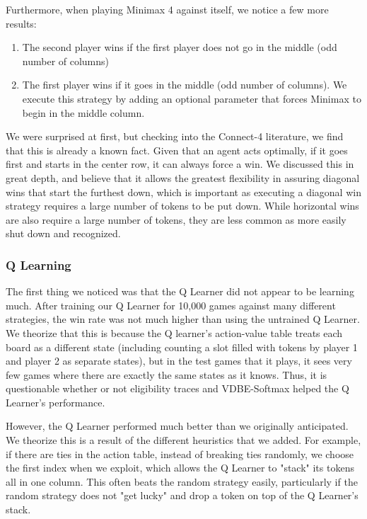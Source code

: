 \documentclass[12pt]{article}
\begin{document}
Furthermore, when playing Minimax 4 against itself, we notice a few more results:

\begin{enumerate}
\item The second player wins if the first player does not go in the middle (odd number of columns)
\item The first player wins if it goes in the middle (odd number of columns). We execute this strategy by adding an optional parameter that forces Minimax to begin in the middle column.
\end{enumerate}

We were surprised at first, but checking into the Connect-4 literature, we find that this is already a known fact. Given that an agent acts optimally, if it goes first and starts in the center row, it can always force a win. We discussed this in great depth, and believe that it allows the greatest flexibility in assuring diagonal wins that start the furthest down, which is important as executing a diagonal win strategy requires a large number of tokens to be put down. While horizontal wins are also require a large number of tokens, they are less common as more easily shut down and recognized.

\subsubsection{Q Learning}

The first thing we noticed was that the Q Learner did not appear to be learning much. After training our Q Learner for 10,000 games against many different strategies, the win rate was not much higher than using the untrained Q Learner. We theorize that this is because the Q learner's action-value table treats each board as a different state (including counting a slot filled with tokens by player 1 and player 2 as separate states), but in the test games that it plays, it sees very few games where there are exactly the same states as it knows. Thus, it is questionable whether or not eligibility traces and VDBE-Softmax helped the Q Learner's performance.

However, the Q Learner performed much better than we originally anticipated. We theorize this is a result of the different heuristics that we added. For example, if there are ties in the action table, instead of breaking ties randomly, we choose the first index when we exploit, which allows the Q Learner to "stack" its tokens all in one column. This often beats the random strategy easily, particularly if the random strategy does not "get lucky" and drop a token on top of the Q Learner's stack. 
\end{document}
